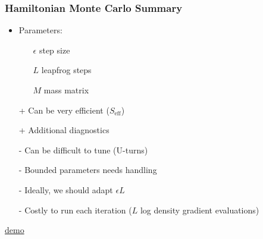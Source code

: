 \documentclass[10pt]{beamer}
\begin{document}
\begin{frame}

\end{frame}


\begin{frame}
\frametitle{Hamiltonian Monte Carlo Summary}

\begin{itemize}
\item Parameters:
\begin{itemize}
\item[$\epsilon$] step size \pause
\item[$L$] leapfrog steps\pause
\item[$M$] mass matrix\pause
\end{itemize}
\item[+] Can be very efficient ($S_\text{eff}$)
\item[+] Additional diagnostics
\pause
\item[-] Can be difficult to tune (U-turns)
\item[-] Bounded parameters needs handling
\item[-] Ideally, we should adapt $\epsilon L$
\item[-] Costly to run each iteration ($L$ log density gradient evaluations)
\pause
\end{itemize}

\centering
\href{https://chi-feng.github.io/mcmc-demo/app.html?algorithm=HamiltonianMC&target=standard}{demo}

\end{frame}
\end{document}
